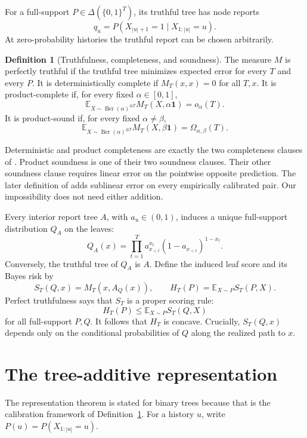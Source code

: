 \documentclass{article}
\theoremstyle{definition}
\newtheorem{definition}[theorem]{Definition}
\theoremstyle{remark}
\newcommand{\Ber}{\operatorname{Ber}}
\newcommand{\E}{\mathbb E}
\newcommand{\1}{\mathbf 1}
\newcommand{\simplex}{\Delta}
\begin{document}
For a full-support \(P\in\simplex(\{0,1\}^T)\), its truthful tree has node reports \[ q_u=P(X_{|u|+1}=1\mid X_{1:|u|}=u). \] At zero-probability histories the truthful report can be chosen arbitrarily.

\begin{definition}[Truthfulness, completeness, and soundness]\label{def:properties}
The measure \(M\) is perfectly truthful if the truthful tree minimizes expected error for every \(T\) and every \(P\). It is deterministically complete if \(M_T(x,x)=0\) for all \(T,x\). It is product-complete if, for every fixed \(\alpha\in[0,1]\), \[ \E_{X\sim\Ber(\alpha)^{\otimes T}}M_T(X,\alpha\1)=o_\alpha(T). \] It is product-sound if, for every fixed \(\alpha\ne\beta\), \[ \E_{X\sim\Ber(\alpha)^{\otimes T}}M_T(X,\beta\1)=\Omega_{\alpha,\beta}(T). \]
\end{definition}

Deterministic and product completeness are exactly the two completeness clauses of \citet{haghtalab2024truthfulness}. Product soundness is one of their two soundness clauses. Their other soundness clause requires linear error on the pointwise opposite prediction. The later definition of \citet{qiao2025decision} adds sublinear error on every empirically calibrated pair. Our impossibility does not need either addition.

Every interior report tree \(A\), with \(a_u\in(0,1)\), induces a unique full-support distribution \(Q_A\) on the leaves: \[ Q_A(x)=\prod_{t=1}^T a_{x_{<t}}^{x_t}(1-a_{x_{<t}})^{1-x_t}. \] Conversely, the truthful tree of \(Q_A\) is \(A\). Define the induced leaf score and its Bayes risk by \[ S_T(Q,x)=M_T(x,A_Q(x)),\qquad H_T(P)=\E_{X\sim P}S_T(P,X). \tag{1} \] Perfect truthfulness says that \(S_T\) is a proper scoring rule: \[ H_T(P)\le \E_{X\sim P}S_T(Q,X) \tag{2} \] for all full-support \(P,Q\). It follows that \(H_T\) is concave. Crucially, \(S_T(Q,x)\) depends only on the conditional probabilities of \(Q\) along the realized path to \(x\).

\section{The tree-additive representation}

The representation theorem is stated for binary trees because that is the calibration framework of Definition~\ref{def:properties}. For a history \(u\), write \(P(u)=P(X_{1:|u|}=u)\).
\end{document}
